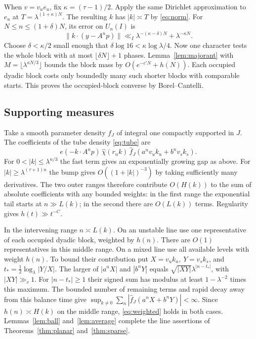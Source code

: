 \documentclass[11pt,a4paper,reqno]{amsart}
\theoremstyle{definition}
\theoremstyle{remark}
\numberwithin{equation}{section}
\begin{document}
When \(v=v_u e_u\), fix \(\kappa=(\tau-1)/2\). Apply the same
Dirichlet approximation to \(e_u\) at \(T=\lambda^{(1+\kappa)N}\).
The resulting \(k\) has \(|k|\asymp T\) by \eqref{eq:norm}.
For \(N\le n\le(1+\delta)N\), its error on \(U_n(I)\) is
\[
 \|k\cdot(y-A^np)\|\ll_I
      \lambda^{-(\kappa-\delta)N}+\lambda^{-\kappa N}.
\]
Choose \(\delta<\kappa/2\) small enough that
\(\delta\log16<\kappa\log\lambda/4\). Now one character tests the
whole block with at most \(\lfloor\delta N\rfloor+1\) phases.
Lemma~\ref{lem:majorant} with \(M=\lfloor\lambda^{\kappa N/3}\rfloor\)
bounds the block mass by \(O(e^{-c'N}+h(N))\). Each occupied dyadic
block costs only boundedly many such shorter blocks with comparable
starts. This proves the occupied-block converse by Borel--Cantelli.

\subsection{Supporting measures}
Take a smooth parameter density \(f_J\) of integral one compactly
supported in \(J\). The coefficients of the tube density \eqref{eq:tube}
are
\begin{equation}\label{eq:linefourier}
 e(-k\cdot A^np)\,\widehat\chi(r_nk)\,
 \widehat f_J(a^n v_u k_u+b^n v_s k_s).
\end{equation}
For \(0<|k|\le\lambda^{n/3}\) the fast term gives an exponentially
growing gap as above. For \(|k|\ge \lambda^{(\tau+1)n}\) the bump gives
\(O((1+|k|)^{-3})\) by taking sufficiently many derivatives. The two
outer ranges therefore contribute \(O(H(k))\) to the sum of absolute
coefficients with any bounded weights: in the first range the exponential
tail starts at \(n\gg L(k)\); in the second there are \(O(L(k))\)
terms. Regularity gives \(h(t)\gg t^{-C}\).

In the intervening range \(n\asymp L(k)\). On an unstable line use
one representative of each occupied dyadic block, weighted by \(h(n)\).
There are \(O(1)\) representatives in this middle range. On a mixed line
use all available levels with weight \(h(n)\). To bound their contribution
put \(X=v_uk_u,\ Y=v_sk_s\), and \(t_*=\tfrac12\log_\lambda|Y/X|\).
The larger of \(|a^n X|\) and \(|b^nY|\) equals
\(\sqrt{|XY|}\lambda^{|n-t_*|}\), with \(|XY|\gg_v1\).
For \(|n-t_*|\ge1\) their signed sum has modulus at least
\(1-\lambda^{-2}\) times this maximum. The bounded number of remaining
terms and rapid decay away from this balance time give
\(\sup_{k\ne0}\sum_n|\widehat f_J(a^nX+b^nY)|<\infty\).
Since \(h(n)\asymp H(k)\) on the middle range, \eqref{eq:weighted}
holds in both cases. Lemmas~\ref{lem:ball} and~\ref{lem:average}
complete the line assertions of Theorems~\ref{thm:planar}
and~\ref{thm:sparse}.
\end{document}
